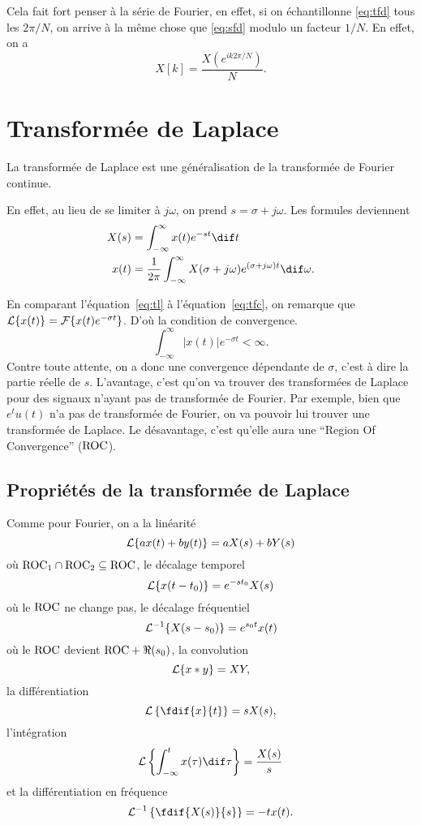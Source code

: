 Cela fait fort penser à la série de Fourier, en effet,
si on échantillonne \eqref{eq:tfd} tous les $2\pi/N$, on arrive
à la même chose que \eqref{eq:sfd} modulo un facteur $1/N$.
En effet, on a
\[ X[k] = \frac{X(e^{ik2\pi/N})}{N}. \]

\section{Transformée de Laplace}
La transformée de Laplace est une généralisation de la transformée de Fourier
continue.

En effet, au lieu de se limiter à $j\omega$, on prend $s = \sigma + j\omega$.
Les formules deviennent
\begin{align}
  \label{eq:tl}
  X(s) & = \int_{-\infty}^\infty x(t) e^{-st} \dif t\\
  \nonumber
  x(t) & = \frac{1}{2\pi}\int_{-\infty}^\infty X(\sigma+j\omega)
  e^{(\sigma+j\omega)t} \dif \omega.
\end{align}

En comparant l'équation~\ref{eq:tl} à l'équation~\ref{eq:tfc}, on remarque que
$\mathcal{L}\{x(t)\} = \mathcal{F}\{x(t) e^{-\sigma t}\}$.
D'où la condition de convergence.
\[ \int_{-\infty}^\infty |x(t)|e^{-\sigma t} < \infty. \]
Contre toute attente, on a donc une convergence dépendante de $\sigma$, c'est
à dire la partie réelle de $s$.
L'avantage, c'est qu'on va trouver des transformées de Laplace pour des
signaux n'ayant pas de transformée de Fourier.
Par exemple, bien que $e^tu(t)$ n'a pas de transformée de Fourier,
on va pouvoir lui trouver une transformée de Laplace.
Le désavantage, c'est qu'elle aura une ``Region Of Convergence'' ($\mathrm{ROC}$).

\subsection{Propriétés de la transformée de Laplace}
Comme pour Fourier, on a la linéarité
\[ \mathcal{L}\{ax(t)+by(t)\} = aX(s) + bY(s) \]
où $\mathrm{ROC}_1 \cap \mathrm{ROC}_2 \subseteq \mathrm{ROC}$,
le décalage temporel
\[ \mathcal{L}\{x(t-t_0)\} = e^{-st_0}X(s) \]
où le $\mathrm{ROC}$ ne change pas,
le décalage fréquentiel
\[ \mathcal{L}^{-1}\{X(s-s_0)\} = e^{s_0t}x(t) \]
où le $\mathrm{ROC}$ devient $\mathrm{ROC} + \Re(s_0)$,
la convolution
\[ \mathcal{L}\{x*y\} = XY, \]
la différentiation
\[ \laplace\left\{\fdif{x}{t}\right\} = sX(s), \]
l'intégration
\[ \laplace\left\{\int_{-\infty}^tx(\tau)\dif\tau\right\} = \frac{X(s)}{s} \]
et la différentiation en fréquence
\[ \laplace^{-1}\left\{\fdif{X(s)}{s}\right\} = -tx(t). \]

